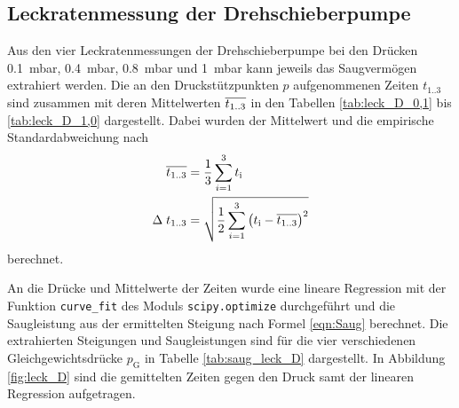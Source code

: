 


\subsection{Leckratenmessung der Drehschieberpumpe}
\label{sec:AuswLeckD}

Aus den vier Leckratenmessungen der Drehschieberpumpe
bei den Drücken \SI{0.1}{\milli\bar},
\SI{0.4}{\milli\bar}, \SI{0.8}{\milli\bar} und \SI{1}{\milli\bar}
kann jeweils das Saugvermögen extrahiert werden.
Die an den Druckstützpunkten $p$ aufgenommenen
Zeiten $t_\text{1..3}$ sind zusammen mit deren Mittelwerten $\overline{t_\text{1..3}}$
in den Tabellen \ref{tab:leck_D_0,1} bis \ref{tab:leck_D_1,0} dargestellt.
Dabei wurden der Mittelwert und die empirische Standardabweichung nach
\begin{align*}
  \overline{t_\text{1..3}} &= \frac{1}{3} \sum_{i = 1}^3 t_\text{i} \\
  \Delta \; t_\text{1..3} &=
  \sqrt{\frac{1}{2} \sum_{i = 1}^3 \left(t_\text{i} - \overline{t_\text{1..3}}\right)^2}
\end{align*}
berechnet.





\FloatBarrier

An die Drücke und Mittelwerte der Zeiten wurde eine
lineare Regression mit der Funktion \texttt{curve\_fit}
des Moduls \texttt{scipy.optimize} durchgeführt
und die Saugleistung aus der ermittelten Steigung nach Formel \eqref{eqn:Saug}
berechnet. Die extrahierten Steigungen und Saugleistungen sind für
die vier verschiedenen Gleichgewichtsdrücke $p_\text{G}$
in Tabelle \ref{tab:saug_leck_D} dargestellt.
In Abbildung \ref{fig:leck_D} sind die gemittelten Zeiten gegen den Druck
samt der linearen Regression aufgetragen.

